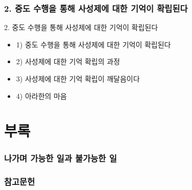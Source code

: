 \documentclass[aspectratio=1610,14pt,xcolor=pdftex,dvipsnames,table,handout]{beamer}
\begin{document}
		\section{2. 중도 수행을 통해 사성제에 대한 기억이 확립된다}
		\frame [plain] {\sectionpage}

		\begin{frame} [t,plain]
			\begin{block} {2. 중도 수행을 통해 사성제에 대한 기억이 확립된다}
			\begin{itemize}
				\item 1) 중도 수행을 통해 사성제에 대한 기억이 확립된다
				\item 2) 사성제에 대한 기억 확립의 과정
				\item 3) 사성제에 대한 기억 확립이 깨달음이다
				\item 4) 아라한의 마음
			\end{itemize}
			\end{block}
		\end{frame}

		\part{부록}
		\frame{\partpage}

		\section{나가며  가능한 일과 불가능한 일}
		\frame [plain] {\sectionpage}


		\section{참고문헌}
		\frame [plain] {\sectionpage}






\end{document}
